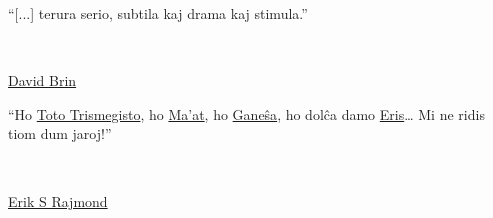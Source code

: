 \makeatletter
\newlength{\beforeblurbskip}
  \setlength{\beforeblurbskip}{.5\baselineskip}
\newlength{\afterblurbskip}
  \setlength{\afterblurbskip}{.5\baselineskip}
\newlength{\blurbwidth}
  \setlength{\blurbwidth}{.6\textwidth}
\newlength{\blurbrule}
  \setlength{\blurbrule}{.4\p@}
\newcommand{\blurbsize}{\small}
\newcommand{\blurbflush}{flushright}

\newcommand{\blurbfontsize}[1]{\def\blurbsize{#1}}
\newcommand{\blurbposition}[1]{\long\def\blurbflush{#1}}
\newcommand{\blurbtextposition}[1]{\def\textflush{#1}}
\newcommand{\blurbsourceposition}[1]{\def\sourceflush{#1}}

\newcommand{\@blurbrule}{\rule[.5ex]{\blurbwidth}{\blurbrule}}

\newcommand{\@blurbtext}[1]{%
  \begin{minipage}{\blurbwidth}\begin{\textflush} #1\par
    \ifdim\blurbrule>\z@ \@blurbrule \else \vspace*{1ex} \fi
  \end{\textflush}\end{minipage}}

  \newcommand{\@blurbsource}[1]{%
  \begin{minipage}{\blurbwidth}
    \begin{\sourceflush} #1\par
  \end{\sourceflush}\end{minipage}}

\newcommand{\blurb}[2]{
	\vspace{\beforeblurbskip}
	{\blurbsize
	\begin{\blurbflush}
		\begin{minipage}{8cm} \@blurbtext{#1}\\ \@blurbsource{#2} \end{minipage}
	\end{\blurbflush}
	\vspace{\afterblurbskip}}}
\makeatother

\thispagestyle{empty}
\blurb{“[...] terura serio, subtila kaj drama kaj stimula.”}{\href{https://wikipedia.org/wiki/David_Brin}{David Brin}}
\blurb{“Ho \href{https://eo.wikipedia.org/wiki/Hermeso_Trismegisto}{Toto Trismegisto}, ho \href{https://eo.wikipedia.org/wiki/Maat}{Ma’at}, ho \href{https://eo.wikipedia.org/wiki/Ganeŝa}{Ganeŝa}, ho dolĉa damo \href{https://eo.wikipedia.org/wiki/Diskordianismo#Eris}{Eris}… Mi ne ridis tiom dum jaroj!”}{\href{https://eo.wikipedia.org/wiki/Eric_S._Raymond}{Erik S Rajmond}}
\thispagestyle{empty}
